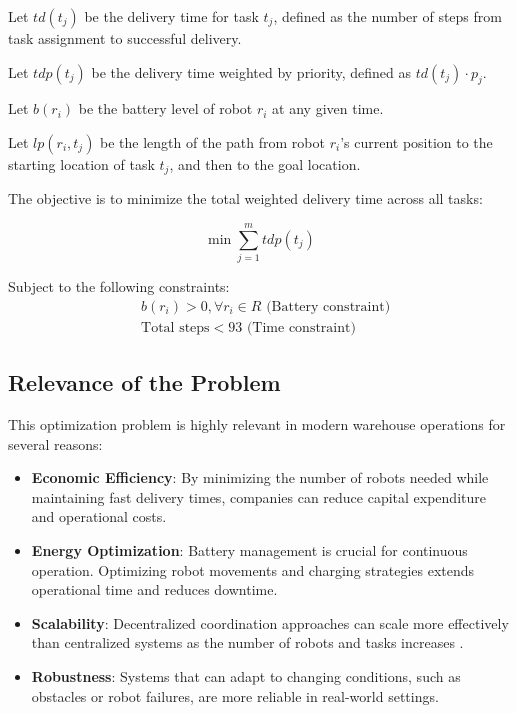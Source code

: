 \documentclass[12pt,a4paper]{article}
\begin{document}
Let $td(t_j)$ be the delivery time for task $t_j$, defined as the number of steps from task assignment to successful delivery.

Let $tdp(t_j)$ be the delivery time weighted by priority, defined as $td(t_j) \cdot p_j$.

Let $b(r_i)$ be the battery level of robot $r_i$ at any given time.

Let $lp(r_i, t_j)$ be the length of the path from robot $r_i$'s current position to the starting location of task $t_j$, and then to the goal location.

The objective is to minimize the total weighted delivery time across all tasks:

\begin{equation}
\min \sum_{j=1}^{m} tdp(t_j)
\end{equation}

Subject to the following constraints:
\begin{align}
& b(r_i) > 0, \forall r_i \in R \text{ (Battery constraint)} \\ 
& \text{Total steps} < 93 \text{ (Time constraint)}
\end{align}

\subsection{Relevance of the Problem}
This optimization problem is highly relevant in modern warehouse operations for several reasons:

\begin{itemize}
    \item \textbf{Economic Efficiency}: By minimizing the number of robots needed while maintaining fast delivery times, companies can reduce capital expenditure and operational costs.

    \item \textbf{Energy Optimization}: Battery management is crucial for continuous operation. Optimizing robot movements and charging strategies extends operational time and reduces downtime.

    \item \textbf{Scalability}: Decentralized coordination approaches can scale more effectively than centralized systems as the number of robots and tasks increases \cite{khamis2015multi}.

    \item \textbf{Robustness}: Systems that can adapt to changing conditions, such as obstacles or robot failures, are more reliable in real-world settings.
\end{itemize}
\end{document}
